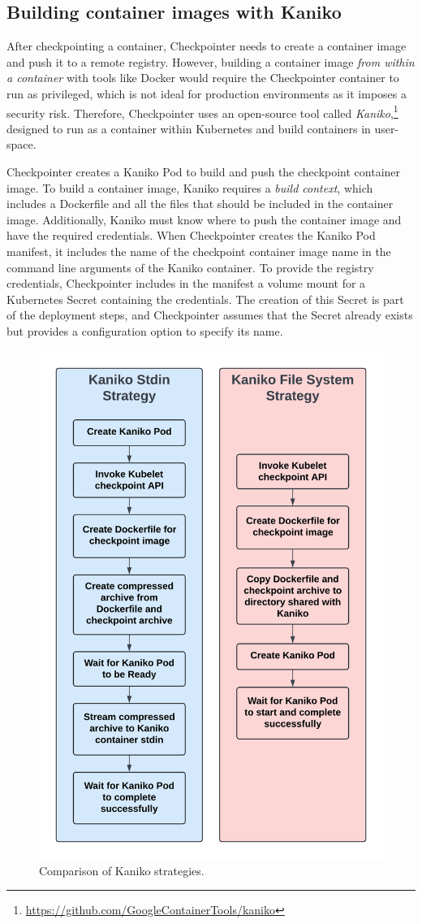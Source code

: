 \documentclass[
  digital,     %
  oneside,     %
  nosansbold,  %
  nocolorbold, %
  lof,         %
  nolot,         %
]{fithesis4}
\begin{document}
\subsection{Building container images with Kaniko}
\label{sec:kaniko-strategies}
After checkpointing a container, Checkpointer needs to create a container image and push it to a remote registry. However, building a container image \emph{from within a container} with tools like Docker would require the Checkpointer container to run as privileged, which is not ideal for production environments as it imposes a security risk. Therefore, Checkpointer uses an open-source tool called \emph{Kaniko},\footnote{\url{https://github.com/GoogleContainerTools/kaniko}} designed to run as a container within Kubernetes and build containers in user-space.

Checkpointer creates a Kaniko Pod to build and push the checkpoint container image. To build a container image, Kaniko requires a \emph{build context}, which includes a Dockerfile and all the files that should be included in the container image. Additionally, Kaniko must know where to push the container image and have the required credentials. When Checkpointer creates the Kaniko Pod manifest, it includes the name of the checkpoint container image name in the command line arguments of the Kaniko container. To provide the registry credentials, Checkpointer includes in the manifest a volume mount for a Kubernetes Secret containing the credentials. The creation of this Secret is part of the deployment steps, and Checkpointer assumes that the Secret already exists but provides a configuration option to specify its name.

\begin{figure}[H]
  \begin{center}
  \includegraphics[width=.5\textwidth]{figures/kaniko-strategies.png}
  \end{center}
  \caption{Comparison of Kaniko strategies.}
  \label{fig:kaniko-strategies}
\end{figure}
\end{document}
